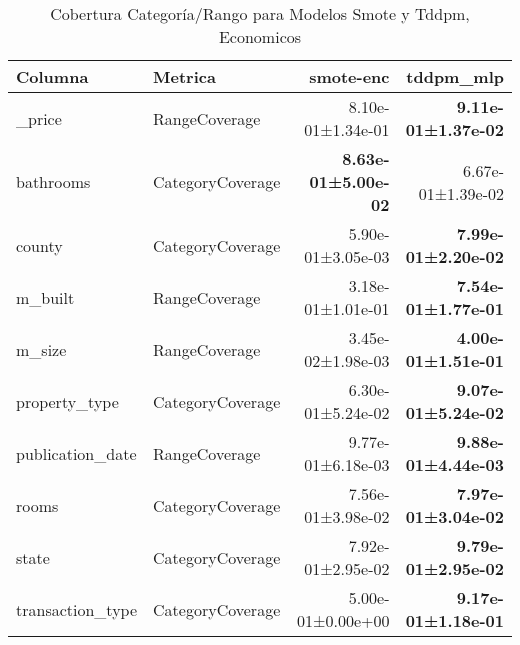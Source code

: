 \begin{table}[H]
\centering
\caption{Cobertura Categoría/Rango para Modelos Smote y Tddpm, Economicos}
\label{table-coverage-economicos-a}
\begin{tabular}{|l|l|r|r|}
\hline
\rowcolor[gray]{0.8}
Columna & Metrica & smote-enc & tddpm\_mlp \\
\hline \_price & RangeCoverage & 8.10e-01±1.34e-01 & \bfseries 9.11e-01±1.37e-02 \\
\hline bathrooms & CategoryCoverage & \bfseries 8.63e-01±5.00e-02 & 6.67e-01±1.39e-02 \\
\hline county & CategoryCoverage & 5.90e-01±3.05e-03 & \bfseries 7.99e-01±2.20e-02 \\
\hline m\_built & RangeCoverage & 3.18e-01±1.01e-01 & \bfseries 7.54e-01±1.77e-01 \\
\hline m\_size & RangeCoverage & \cellcolor[rgb]{0.9, 0.54, 0.52} 3.45e-02±1.98e-03 & \bfseries \cellcolor[rgb]{0.9, 0.54, 0.52} 4.00e-01±1.51e-01 \\
\hline property\_type & CategoryCoverage & 6.30e-01±5.24e-02 & \bfseries 9.07e-01±5.24e-02 \\
\hline publication\_date & RangeCoverage & 9.77e-01±6.18e-03 & \bfseries 9.88e-01±4.44e-03 \\
\hline rooms & CategoryCoverage & 7.56e-01±3.98e-02 & \bfseries 7.97e-01±3.04e-02 \\
\hline state & CategoryCoverage & 7.92e-01±2.95e-02 & \bfseries 9.79e-01±2.95e-02 \\
\hline transaction\_type & CategoryCoverage & 5.00e-01±0.00e+00 & \bfseries 9.17e-01±1.18e-01 \\
\hline
\end{tabular}
\end{table}
